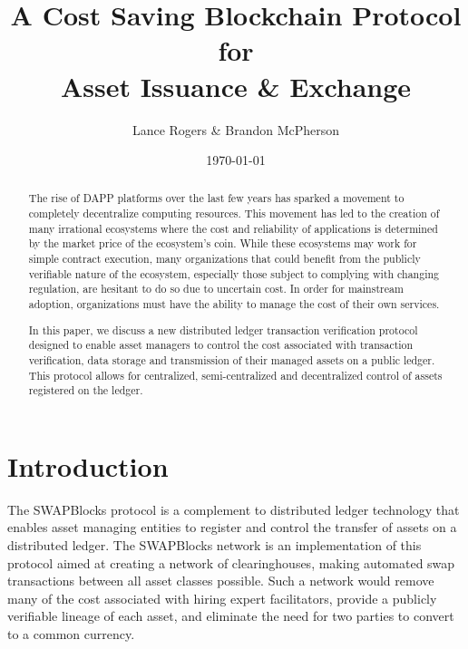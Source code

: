 \documentclass[12pt]{article}
\title{A Cost Saving Blockchain Protocol for\\
Asset Issuance \& Exchange}
\author{Lance Rogers \& Brandon McPherson}
\date{\today}
\begin{document}
\maketitle

\begin{abstract}
	

	
	
The rise of DAPP platforms over the last few years has sparked a movement to 
completely decentralize computing resources.  This movement has led to 
the creation of many irrational ecosystems where the cost and reliability of
applications is determined by the market price of the ecosystem's coin. %
While these ecosystems may work for simple contract execution,
many organizations that could benefit from the publicly verifiable nature of the
ecosystem, especially those subject to complying with changing regulation,
	are hesitant to do so due to uncertain cost. 
In order for mainstream adoption, organizations must have the ability to manage
the cost of their own services.

In this paper, we discuss a new distributed ledger transaction verification
protocol designed to enable asset managers to control the cost associated with
transaction verification, data storage and transmission of their managed assets on 
	a public ledger.
This protocol allows for centralized, semi-centralized 
and decentralized control of assets registered on the ledger. 


\end{abstract}

\pagebreak

\tableofcontents

\pagebreak

\section{Introduction}



The SWAPBlocks protocol is a complement to distributed ledger technology that enables
asset managing entities to register and control the transfer of assets on a distributed
ledger.  The SWAPBlocks network is an implementation of this protocol aimed at creating a network
of clearinghouses, making automated swap transactions between all asset classes possible.  Such a network
would remove many of the cost associated with hiring expert facilitators, provide a publicly verifiable
lineage of each asset, and eliminate the need for two parties to convert to a common currency.
\end{document}

